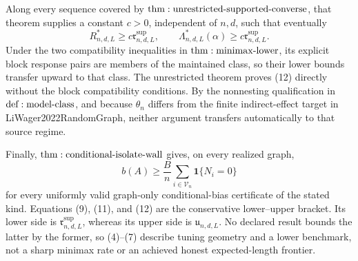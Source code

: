 Along every sequence covered by \({\rm thm:unrestricted\text{-}supported\text{-}converse}\), that theorem supplies a constant \(c>0\), independent of \(n,d\), such that eventually
\[
 R^*_{n,d,L}\geq c\mathfrak r^{\mathrm{sup}}_{n,d,L},
 \qquad
 \Lambda^*_{n,d,L}(\alpha)
 \geq c\mathfrak r^{\mathrm{sup}}_{n,d,L}.
\tag{12}
\]
Under the two compatibility inequalities in \({\rm thm:minimax\text{-}lower}\), its explicit block response pairs are members of the maintained class, so their lower bounds transfer upward to that class.  The unrestricted theorem proves (12) directly without the block compatibility conditions.  By the nonnesting qualification in \({\rm def:model\text{-}class}\), and because \(\theta_n\) differs from the finite indirect-effect target in LiWager2022RandomGraph, neither argument transfers automatically to that source regime.

Finally, \({\rm thm:conditional\text{-}isolate\text{-}wall}\) gives, on every realized graph,
\[
 b(A)\geq\frac Bn\sum_{i\in\mathcal V_n}\mathbf1\{N_i=0\}
\tag{13}
\]
for every uniformly valid graph-only conditional-bias certificate of the stated kind.  Equations (9), (11), and (12) are the conservative lower--upper bracket.  Its lower side is \(\mathfrak r^{\mathrm{sup}}_{n,d,L}\), whereas its upper side is \(\mathfrak u_{n,d,L}\).  No declared result bounds the latter by the former, so (4)--(7) describe tuning geometry and a lower benchmark, not a sharp minimax rate or an achieved honest expected-length frontier.